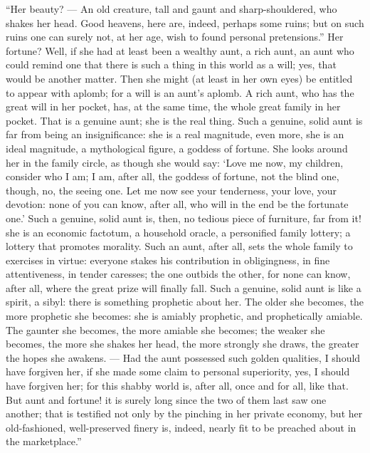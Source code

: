 \documentclass[12pt,a4paper]{book}
\begin{document}
``Her beauty? --- An old creature, tall and gaunt and sharp-shouldered, who shakes her head. Good heavens, here are, indeed, perhaps some ruins; but on such ruins one can surely not, at her age, wish to found personal pretensions.''
Her fortune? Well, if she had at least been a wealthy aunt, a rich aunt, an aunt who could remind one that there is such a thing in this world as a will; yes, that would be another matter. Then she might (at least in her own eyes) be entitled to appear with aplomb; for a will is an aunt's aplomb. A rich aunt, who has the great will in her pocket, has, at the same time, the whole great family in her pocket. That is a genuine aunt; she is the real thing. Such a genuine, solid aunt is far from being an insignificance: she is a real magnitude, even more, she is an ideal magnitude, a mythological figure, a goddess of fortune. She looks around her in the family circle, as though she would say: `Love me now, my children, consider who I am; I am, after all, the goddess of fortune, not the blind one, though, no, the seeing one. Let me now see your tenderness, your love, your devotion: none of you can know, after all, who will in the end be the fortunate one.' Such a genuine, solid aunt is, then, no tedious piece of furniture, far from it! she is an economic factotum, a household oracle, a personified family lottery; a lottery that promotes morality. Such an aunt, after all, sets the whole family to exercises in virtue: everyone stakes his contribution in obligingness, in fine attentiveness, in tender caresses; the one outbids the other, for none can know, after all, where the great prize will finally fall. Such a genuine, solid aunt is like a spirit, a sibyl: there is something prophetic about her. The older she becomes, the more prophetic she becomes: she is amiably prophetic, and prophetically amiable. The gaunter she becomes, the more amiable she becomes; the weaker she becomes, the more she shakes her head, the more strongly she draws, the greater the hopes she awakens. --- Had the aunt possessed such golden qualities, I should have forgiven her, if she made some claim to personal superiority, yes, I should have forgiven her; for this shabby world is, after all, once and for all, like that. But aunt and fortune! it is surely long since the two of them last saw one another; that is testified not only by the pinching
in her private economy, but her old-fashioned, well-preserved finery is, indeed, nearly fit to be preached about in the marketplace.''
\end{document}

